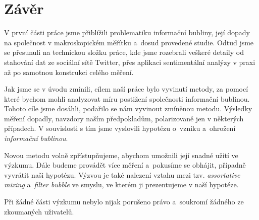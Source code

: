 \documentclass[12pt, a4paper]{article}
\numberwithin{equation}{section} 	%
\begin{document}
\newpage
\section{Závěr}
\noindent V první části práce jsme přiblížili problematiku informační bubliny, její dopady na společnost v makroskopickém měřítku a~dosud provedené studie.  Odtud jsme se přesunuli na technickou složku práce, kde jsme rozebrali veškeré detaily od stahování dat ze sociální sítě Twitter, přes aplikaci sentimentální analýzy v praxi až po samotnou konstrukci celého měření.

Jak jsme se v úvodu zmínili, cílem naší práce bylo vyvinutí metody, za pomocí které bychom mohli analyzovat míru postižení společnosti informační bublinou. Tohoto cíle jsme dosáhli, podařilo se nám vyvinout zmíněnou metodu. Výsledky měření dopadly, navzdory naším předpokladům, polarizovaně jen v některých případech. V souvislosti s tím jsme vyslovili hypotézu o~vzniku a~ohrožení \textit{informační bublinou}.

Novou metodu volně zpřístupňujeme, abychom umožnili její snadné užití ve výzkumu. Dále budeme provádět více měření a~pokusíme se obhájit, případně vyvrátit naši hypotézu. Výzvou je také nalezení vztahu mezi tzv. \textit{assortative mixing} a~\textit{filter bubble} ve smyslu, ve kterém ji prezentujeme v naší hypotéze.

Při žádné části výzkumu nebylo nijak porušeno právo a~soukromí žádného ze zkoumaných uživatelů.
\end{document}
